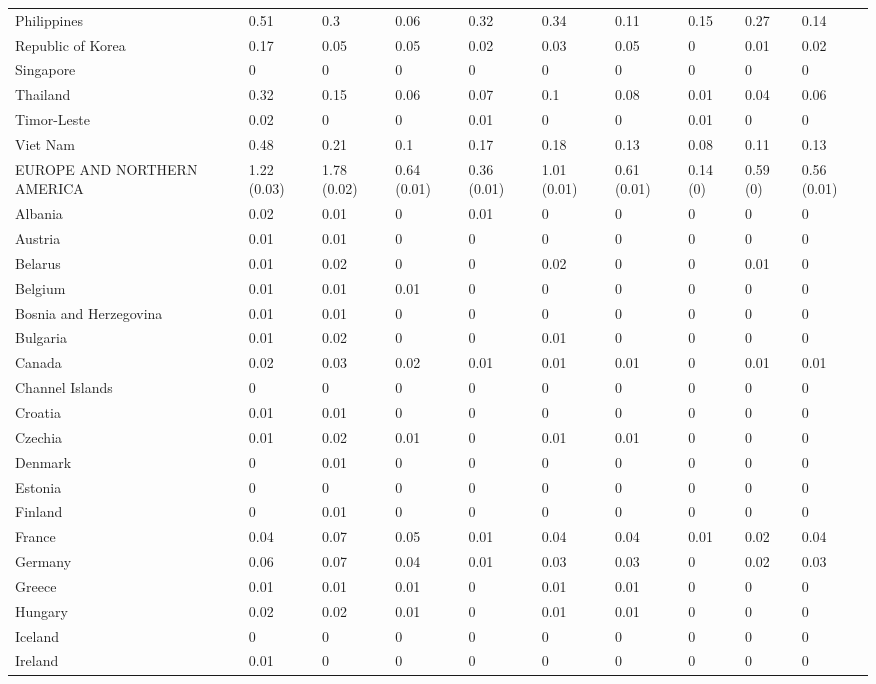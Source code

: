 \begin{longtable}[t]{llllllllll}
Philippines & 0.51 & 0.3 & 0.06 & 0.32 & 0.34 & 0.11 & 0.15 & 0.27 & 0.14\\
Republic of Korea & 0.17 & 0.05 & 0.05 & 0.02 & 0.03 & 0.05 & 0 & 0.01 & 0.02\\
Singapore & 0 & 0 & 0 & 0 & 0 & 0 & 0 & 0 & 0\\
Thailand & 0.32 & 0.15 & 0.06 & 0.07 & 0.1 & 0.08 & 0.01 & 0.04 & 0.06\\
Timor-Leste & 0.02 & 0 & 0 & 0.01 & 0 & 0 & 0.01 & 0 & 0\\
Viet Nam & 0.48 & 0.21 & 0.1 & 0.17 & 0.18 & 0.13 & 0.08 & 0.11 & 0.13\\
EUROPE AND NORTHERN AMERICA & 1.22 (0.03) & 1.78 (0.02) & 0.64 (0.01) & 0.36 (0.01) & 1.01 (0.01) & 0.61 (0.01) & 0.14 (0) & 0.59 (0) & 0.56 (0.01)\\
Albania & 0.02 & 0.01 & 0 & 0.01 & 0 & 0 & 0 & 0 & 0\\
Austria & 0.01 & 0.01 & 0 & 0 & 0 & 0 & 0 & 0 & 0\\
Belarus & 0.01 & 0.02 & 0 & 0 & 0.02 & 0 & 0 & 0.01 & 0\\
Belgium & 0.01 & 0.01 & 0.01 & 0 & 0 & 0 & 0 & 0 & 0\\
Bosnia and Herzegovina & 0.01 & 0.01 & 0 & 0 & 0 & 0 & 0 & 0 & 0\\
Bulgaria & 0.01 & 0.02 & 0 & 0 & 0.01 & 0 & 0 & 0 & 0\\
Canada & 0.02 & 0.03 & 0.02 & 0.01 & 0.01 & 0.01 & 0 & 0.01 & 0.01\\
Channel Islands & 0 & 0 & 0 & 0 & 0 & 0 & 0 & 0 & 0\\
Croatia & 0.01 & 0.01 & 0 & 0 & 0 & 0 & 0 & 0 & 0\\
Czechia & 0.01 & 0.02 & 0.01 & 0 & 0.01 & 0.01 & 0 & 0 & 0\\
Denmark & 0 & 0.01 & 0 & 0 & 0 & 0 & 0 & 0 & 0\\
Estonia & 0 & 0 & 0 & 0 & 0 & 0 & 0 & 0 & 0\\
Finland & 0 & 0.01 & 0 & 0 & 0 & 0 & 0 & 0 & 0\\
France & 0.04 & 0.07 & 0.05 & 0.01 & 0.04 & 0.04 & 0.01 & 0.02 & 0.04\\
Germany & 0.06 & 0.07 & 0.04 & 0.01 & 0.03 & 0.03 & 0 & 0.02 & 0.03\\
Greece & 0.01 & 0.01 & 0.01 & 0 & 0.01 & 0.01 & 0 & 0 & 0\\
Hungary & 0.02 & 0.02 & 0.01 & 0 & 0.01 & 0.01 & 0 & 0 & 0\\
Iceland & 0 & 0 & 0 & 0 & 0 & 0 & 0 & 0 & 0\\
Ireland & 0.01 & 0 & 0 & 0 & 0 & 0 & 0 & 0 & 0\\

\end{longtable}
